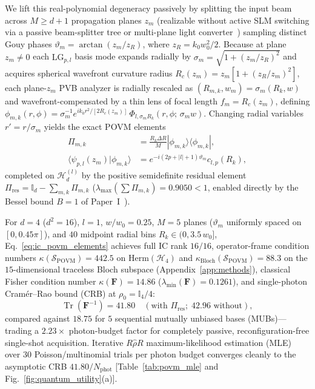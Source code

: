 \documentclass[aps,pra,reprint,nofootinbib,floatfix,longbibliography]{revtex4-2}
\newcommand{\braket}[2]{\langle #1 | #2 \rangle}
\newcommand{\ket}[1]{| #1 \rangle}
\newcommand{\bra}[1]{\langle #1 |}
\newcommand{\abs}[1]{\lvert #1 \rvert}
\begin{document}
We lift this real-polynomial degeneracy passively by splitting the input beam across $M \ge d+1$ propagation planes $z_m$ (realizable without active SLM switching via a passive beam-splitter tree or multi-plane light converter~\cite{Fontaine2019,Bouchard2018}) sampling distinct Gouy phases $\vartheta_m = \arctan(z_m/z_R)$, where $z_R = k_0 w_0^2/2$. Because at plane $z_m \neq 0$ each $\mathrm{LG}_{p,l}$ basis mode expands radially by $\sigma_m = \sqrt{1 + (z_m/z_R)^2}$ and acquires spherical wavefront curvature radius $R_c(z_m) = z_m[1 + (z_R/z_m)^2]$, each plane-$z_m$ PVB analyzer is radially rescaled as $(R_{m,k}, w_m) = \sigma_m(R_k, w)$ and wavefront-compensated by a thin lens of focal length $f_m = R_c(z_m)$, defining $\phi_{m,k}(r,\phi) = \sigma_m^{-1} e^{ik_0 r^2/[2R_c(z_m)]}\,\Phi_{l,\sigma_m R_k}(r,\phi;\,\sigma_m w)$. Changing radial variables $r' = r/\sigma_m$ yields the exact POVM elements~\cite{Renes2004}
\begin{align}
\Pi_{m,k} &= \frac{R_k \Delta R}{M}\ket{\phi_{m,k}}\bra{\phi_{m,k}}, \nonumber \\
\braket{\psi_{p,l}(z_m)}{\phi_{m,k}} &= e^{-i(2p+\abs{l}+1)\vartheta_m} c_{l,p}(R_k),
\label{eq:ic_povm_elements}
\end{align}
completed on $\mathcal{H}_d^{(l)}$ by the positive semidefinite residual element $\Pi_{\mathrm{res}} = \mathbb{I}_d - \sum_{m,k}\Pi_{m,k}$ ($\lambda_{\max}(\sum \Pi_{m,k}) = 0.9050 < 1$, enabled directly by the Bessel bound $B = 1$ of Paper~I~\cite{AyalaPaperI}).

For $d = 4$ ($d^2 = 16$), $l = 1$, $w/w_0 = 0.25$, $M = 5$ planes ($\vartheta_m$ uniformly spaced on $[0, 0.45\pi]$), and $40$ midpoint radial bins $R_k \in (0, 3.5\,w_0]$, Eq.~\eqref{eq:ic_povm_elements} achieves full IC rank $16/16$, operator-frame condition numbers $\kappa(\mathcal{S}_{\mathrm{POVM}}) = 442.5$ on $\mathrm{Herm}(\mathcal{H}_4)$ and $\kappa_{\mathrm{Bloch}}(\mathcal{S}_{\mathrm{POVM}}) = 88.3$ on the $15$-dimensional traceless Bloch subspace (Appendix~\ref{app:methods}), classical Fisher condition number $\kappa(\mathbf{F}) = 14.86$ ($\lambda_{\min}(\mathbf{F}) = 0.1261$), and single-photon Cram\'er--Rao bound (CRB) at $\rho_0 = \mathbb{I}_4/4$:
\begin{equation}
\operatorname{Tr}\!\left(\mathbf{F}^{-1}\right) = 41.80 \quad (\text{with }\Pi_{\mathrm{res}};\; 42.96\text{ without}),
\label{eq:fisher_crb}
\end{equation}
compared against $18.75$ for $5$ sequential mutually unbiased bases (MUBs)---trading a $2.23\times$ photon-budget factor for completely passive, reconfiguration-free single-shot acquisition. Iterative $R\hat{\rho}R$ maximum-likelihood estimation (MLE)~\cite{Lvovsky2004} over $30$ Poisson/multinomial trials per photon budget converges cleanly to the asymptotic CRB $41.80/N_{\mathrm{phot}}$ [Table~\ref{tab:povm_mle} and Fig.~\ref{fig:quantum_utility}(a)].
\end{document}
